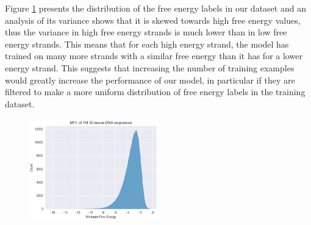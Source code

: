 \documentclass[11pt]{article}
\begin{document}
Figure \ref{fig:distri_values} presents the distribution of the free energy labels in our dataset and an analysis of its variance shows that it is skewed towards high free energy values, thus the variance in high free energy strands is much lower than in low free energy strands. This means that for each high energy strand, the model has trained on many more strands with a similar free energy than it has for a lower energy strand. This suggests that increasing the number of training examples would greatly increase the performance of our model, in particular if they are filtered to make a more uniform distribution of free energy labels in the training dataset.

\begin{figure}[H]
    \caption{}
    \centering
    \includegraphics[width=0.5\textwidth]{images/MFE_nupack.png}
    \label{fig:distri_values}
\end{figure}
\end{document}
